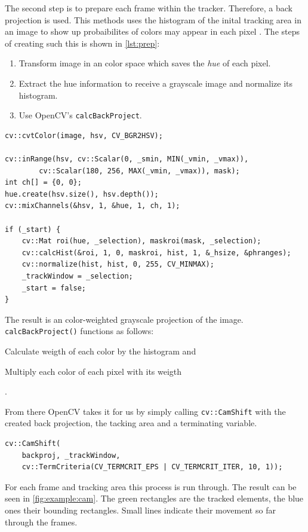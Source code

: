 The second step is to prepare each frame within the tracker. Therefore, a back projection is used. This methods uses the histogram of the inital tracking area in an image to show up probaibilites of colors may appear in each pixel \cite{OpenCVme45:online}. The steps of creating such this is shown in \cref{lst:prep}:
\begin{enumerate}
    \item Transform image in an color space which saves the \textit{hue} of each pixel.
    \item Extract the hue information to receive a grayscale image and normalize its histogram.
    \item Use OpenCV's \texttt{calcBackProject}.
\end{enumerate}


\begin{lstlisting}[caption={Preparation for tracking},label=lst:prep]
cv::cvtColor(image, hsv, CV_BGR2HSV);

cv::inRange(hsv, cv::Scalar(0, _smin, MIN(_vmin, _vmax)),
        cv::Scalar(180, 256, MAX(_vmin, _vmax)), mask);
int ch[] = {0, 0};
hue.create(hsv.size(), hsv.depth());
cv::mixChannels(&hsv, 1, &hue, 1, ch, 1);

if (_start) {
    cv::Mat roi(hue, _selection), maskroi(mask, _selection);
    cv::calcHist(&roi, 1, 0, maskroi, hist, 1, &_hsize, &phranges);
    cv::normalize(hist, hist, 0, 255, CV_MINMAX);
    _trackWindow = _selection;
    _start = false;
}
\end{lstlisting}

The result is an color-weighted grayscale projection of the image. \texttt{calcBackProject()} functions as follows:
\begin{enumerate*}[label= (\roman*)]
    \item Calculate weigth of each color by the histogram and
    \item Multiply each color of each pixel with its weigth
\end{enumerate*}.

From there OpenCV takes it for us by simply calling \texttt{cv::CamShift} with the created back projection, the tacking area and a terminating variable.
\begin{lstlisting}[caption={CAMshift call},label=lst:cam]
cv::CamShift(
    backproj, _trackWindow,
    cv::TermCriteria(CV_TERMCRIT_EPS | CV_TERMCRIT_ITER, 10, 1));
\end{lstlisting}

For each frame and tracking area this process is run through. The result can be seen in \cref{fig:example:cam}. The green rectangles are the tracked elements, the blue ones their bounding rectangles. Small lines indicate their movement so far through the frames.

